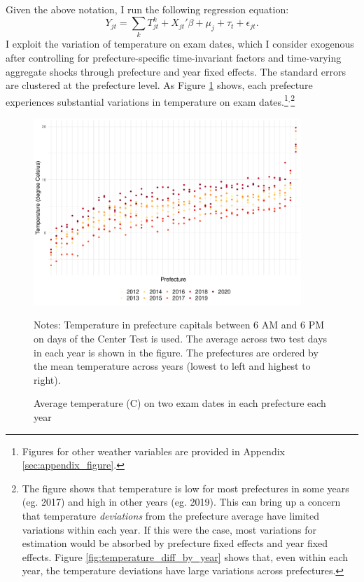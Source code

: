 \documentclass[12pt,letterpaper]{article}
\begin{document}
Given the above notation, I run the following regression equation:
\begin{equation*}
  Y_{jt} = \sum_k T_{jt}^k + X_{jt}' \beta + \mu_j + \tau_t + \epsilon_{jt}.
\end{equation*}
I exploit the variation of temperature on exam dates, which I consider exogenous after controlling for prefecture-specific time-invariant factors and time-varying aggregate shocks through prefecture and year fixed effects.
The standard errors are clustered at the prefecture level.
As Figure \ref{fig:temperature_diff} shows, each prefecture experiences substantial variations in temperature on exam dates.\footnote{
  Figures for other weather variables are provided in Appendix \ref{sec:appendix_figure}.
}$^,$\footnote{
  The figure shows that temperature is low for most prefectures in some years (eg. 2017) and high in other years (eg. 2019).
  This can bring up a concern that temperature \textit{deviations} from the prefecture average have limited variations within each year.
  If this were the case, most variations for estimation would be absorbed by prefecture fixed effects and year fixed effects.
  Figure \ref{fig:temperature_diff_by_year} shows that, even within each year, the temperature deviations have large variations across prefectures.
}

\begin{figure}[H]
  \centering
  \caption{Average temperature (\degree C) on two exam dates in each prefecture each year}
  \includegraphics[width = 0.9\textwidth]{../Output/images/temperature_diff.pdf}
  \label{fig:temperature_diff}
  \footnotesize
  \begin{tablenotes}
    \item Notes:
      Temperature in prefecture capitals between 6 AM and 6 PM on days of the Center Test is used.
      The average across two test days in each year is shown in the figure.
      The prefectures are ordered by the mean temperature across years (lowest to left and highest to right).
  \end{tablenotes}
\end{figure}
\end{document}

